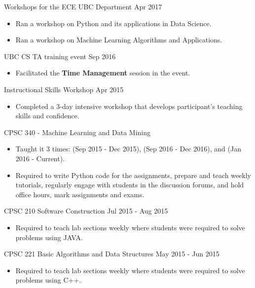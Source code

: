 \documentclass[10pt]{article}
\newenvironment{innerlist}[1][\enskip\textbullet]%
        {\begin{itemize}[#1,leftmargin=*,parsep=0pt,itemsep=0pt,topsep=0pt,partopsep=0pt]}
        {\end{itemize}}
\begin{document}
Workshops for the ECE UBC Department \hfill Apr 2017
\begin{innerlist}
    \item Ran a workshop on Python and its applications in Data Science.
    \item Ran a workshop on Machine Learning Algorithms and Applications.\\
\end{innerlist}

UBC CS TA training event \hfill Sep 2016
\begin{innerlist}
    \item Facilitated the {\bf Time Management} session in the event.\\
\end{innerlist}

Instructional Skills Workshop \hfill Apr 2015
\begin{innerlist}
    \item Completed a 3-day intensive workshop that develops participant's teaching skills and confidence.\\
\end{innerlist}


CPSC 340 - Machine Learning and Data Mining
\begin{innerlist}
    \item Taught it 3 times: (Sep 2015 - Dec 2015), (Sep 2016 - Dec 2016), and (Jan 2016 - Current).
    \item Required to write Python code for the assignments, prepare and teach weekly tutorials, regularly engage with students in the discussion forums, and hold office hours, mark assignments and exams.\\
\end{innerlist}

CPSC 210 Software Construction \hfill Jul 2015 - Aug 2015
\begin{innerlist}
    \item Required to teach lab sections weekly where students were required to solve problems using JAVA.\\
\end{innerlist}

CPSC 221 Basic Algorithms and Data Structures  \hfill May 2015 - Jun 2015
\begin{innerlist}
   \item Required to teach lab sections weekly where students were required to solve problems using C++.\\
\end{innerlist}
\end{document}
